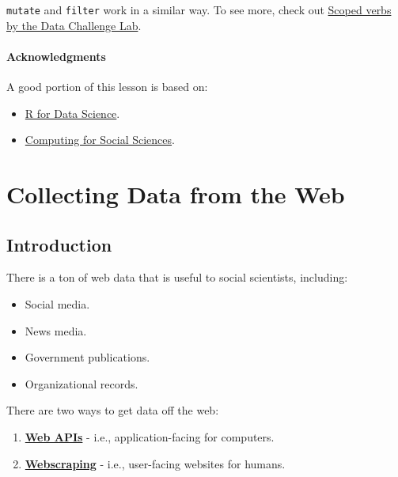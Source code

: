 \documentclass[
]{book}
\providecommand{\tightlist}{%
  \setlength{\itemsep}{0pt}\setlength{\parskip}{0pt}}
\begin{document}
\texttt{mutate} and \texttt{filter} work in a similar way. To see more, check out \href{https://dcl-2017-04.github.io/curriculum/manip-scoped.html}{Scoped verbs by the Data Challenge Lab}.

\hypertarget{acknowledgments-5}{%
\subsubsection*{Acknowledgments}\label{acknowledgments-5}}

A good portion of this lesson is based on:

\begin{itemize}
\tightlist
\item
  \href{https://r4ds.had.co.nz/}{R for Data Science}.
\item
  \href{https://cfss.uchicago.edu}{Computing for Social Sciences}.
\end{itemize}

\hypertarget{collecting-data-from-the-web}{%
\chapter{Collecting Data from the Web}\label{collecting-data-from-the-web}}

\hypertarget{introduction-1}{%
\section{Introduction}\label{introduction-1}}

There is a ton of web data that is useful to social scientists, including:

\begin{itemize}
\tightlist
\item
  Social media.
\item
  News media.
\item
  Government publications.
\item
  Organizational records.
\end{itemize}

There are two ways to get data off the web:

\begin{enumerate}
\def\labelenumi{\arabic{enumi}.}
\tightlist
\item
  \textbf{\protect\hyperlink{web-apis}{Web APIs}} - i.e., application-facing for computers.
\item
  \textbf{\protect\hyperlink{webscraping}{Webscraping}} - i.e., user-facing websites for humans.
\end{enumerate}
\end{document}

